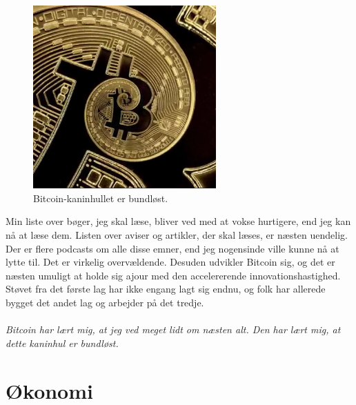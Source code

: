 \documentclass[paper=6in:9in,pagesize=pdftex,headinclude=on,footinclude=on,12pt]{scrbook}
\begin{document}
\begin{figure}
  \centering
  \includegraphics[width=7cm]{assets/images/rabbit-hole-bottomless.png}
  \caption{Bitcoin-kaninhullet er bundløst.}
  \label{fig:rabbit-hole-bottomless}
\end{figure}

Min liste over bøger, jeg skal læse, bliver ved med at vokse hurtigere, end jeg kan nå at læse dem. Listen over aviser og artikler, der skal læses, er næsten uendelig. Der er flere podcasts om alle disse emner, end jeg nogensinde ville kunne nå at lytte til. Det er virkelig overvældende. Desuden udvikler Bitcoin sig, og det er næsten umuligt at holde sig ajour med den accelererende innovationshastighed. Støvet fra det første lag har ikke engang lagt sig endnu, og folk har allerede bygget det andet lag og arbejder på det tredje.\paragraph{Bitcoin har lært mig, at jeg ved meget lidt om næsten alt. Den har lært mig, at dette kaninhul er bundløst.}%
%
%
%
%
%

\part{Økonomi}
\label{ch:economics}
\end{document}
